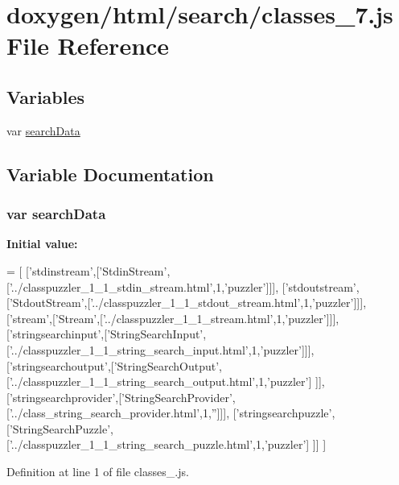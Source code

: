 \hypertarget{a00068}{}\section{doxygen/html/search/classes\+\_\+7.js File Reference}
\label{a00068}
\subsection*{Variables}
\begin{DoxyCompactItemize}
\item 
var \hyperlink{a00068_ad01a7523f103d6242ef9b0451861231e}{search\+Data}
\end{DoxyCompactItemize}


\subsection{Variable Documentation}
\hypertarget{a00068_ad01a7523f103d6242ef9b0451861231e}{}
\subsubsection[{search\+Data}]{\setlength{\rightskip}{0pt plus 5cm}var search\+Data}\label{a00068_ad01a7523f103d6242ef9b0451861231e}
{\bfseries Initial value\+:}
\begin{DoxyCode}
=
[
  [\textcolor{stringliteral}{'stdinstream'},[\textcolor{stringliteral}{'StdinStream'},[\textcolor{stringliteral}{'../classpuzzler\_1\_1\_stdin\_stream.html'},1,\textcolor{stringliteral}{'puzzler'}]]],
  [\textcolor{stringliteral}{'stdoutstream'},[\textcolor{stringliteral}{'StdoutStream'},[\textcolor{stringliteral}{'../classpuzzler\_1\_1\_stdout\_stream.html'},1,\textcolor{stringliteral}{'puzzler'}]]],
  [\textcolor{stringliteral}{'stream'},[\textcolor{stringliteral}{'Stream'},[\textcolor{stringliteral}{'../classpuzzler\_1\_1\_stream.html'},1,\textcolor{stringliteral}{'puzzler'}]]],
  [\textcolor{stringliteral}{'stringsearchinput'},[\textcolor{stringliteral}{'StringSearchInput'},[\textcolor{stringliteral}{'../classpuzzler\_1\_1\_string\_search\_input.html'},1,\textcolor{stringliteral}{'puzzler'}]]],
  [\textcolor{stringliteral}{'stringsearchoutput'},[\textcolor{stringliteral}{'StringSearchOutput'},[\textcolor{stringliteral}{'../classpuzzler\_1\_1\_string\_search\_output.html'},1,\textcolor{stringliteral}{'puzzler'}]
      ]],
  [\textcolor{stringliteral}{'stringsearchprovider'},[\textcolor{stringliteral}{'StringSearchProvider'},[\textcolor{stringliteral}{'../class\_string\_search\_provider.html'},1,\textcolor{stringliteral}{''}]]],
  [\textcolor{stringliteral}{'stringsearchpuzzle'},[\textcolor{stringliteral}{'StringSearchPuzzle'},[\textcolor{stringliteral}{'../classpuzzler\_1\_1\_string\_search\_puzzle.html'},1,\textcolor{stringliteral}{'puzzler'}]
      ]]
]
\end{DoxyCode}


Definition at line 1 of file classes\+\_.\+js.


